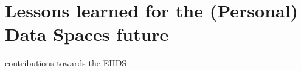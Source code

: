 \section{Lessons learned for the (Personal) Data Spaces future}
\label{sec:lessons}

contributions towards the EHDS